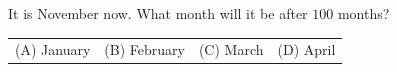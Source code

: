 It is November now. What month will it be after $100$ months?



\begin{tabular}{llll}
(A) January & (B) February & (C) March & (D) April
\end{tabular}
